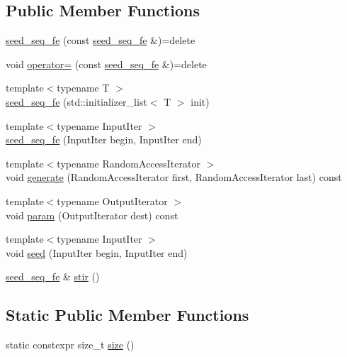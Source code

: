 \subsection*{Public Member Functions}
\begin{DoxyCompactItemize}
\item 
\hyperlink{structrandutils_1_1seed__seq__fe_adfc89fa1466e011b999baad509645b50}{seed\+\_\+seq\+\_\+fe} (const \hyperlink{structrandutils_1_1seed__seq__fe}{seed\+\_\+seq\+\_\+fe} \&)=delete
\item 
void \hyperlink{structrandutils_1_1seed__seq__fe_a117fb76a53d51b628c7ef267b47f0753}{operator=} (const \hyperlink{structrandutils_1_1seed__seq__fe}{seed\+\_\+seq\+\_\+fe} \&)=delete
\item 
{\footnotesize template$<$typename T $>$ }\\\hyperlink{structrandutils_1_1seed__seq__fe_ad716e450723c10c84a725a2e7bd0fbcd}{seed\+\_\+seq\+\_\+fe} (std\+::initializer\+\_\+list$<$ T $>$ init)
\item 
{\footnotesize template$<$typename Input\+Iter $>$ }\\\hyperlink{structrandutils_1_1seed__seq__fe_a18d0ce2ce0ac242c65e7d0aade46816e}{seed\+\_\+seq\+\_\+fe} (Input\+Iter begin, Input\+Iter end)
\item 
{\footnotesize template$<$typename Random\+Access\+Iterator $>$ }\\void \hyperlink{structrandutils_1_1seed__seq__fe_ae7622793bcbdafbeeb533413b1e3e340}{generate} (Random\+Access\+Iterator first, Random\+Access\+Iterator last) const 
\item 
{\footnotesize template$<$typename Output\+Iterator $>$ }\\void \hyperlink{structrandutils_1_1seed__seq__fe_a8b35797e2f894d92bd02cc5eb45f6915}{param} (Output\+Iterator dest) const 
\item 
{\footnotesize template$<$typename Input\+Iter $>$ }\\void \hyperlink{structrandutils_1_1seed__seq__fe_ad4b55fdb44ca51461e4e9aa9ec6aba89}{seed} (Input\+Iter begin, Input\+Iter end)
\item 
\hyperlink{structrandutils_1_1seed__seq__fe}{seed\+\_\+seq\+\_\+fe} \& \hyperlink{structrandutils_1_1seed__seq__fe_af0bd79352a6fee86f10fb4d45058ef79}{stir} ()
\end{DoxyCompactItemize}
\subsection*{Static Public Member Functions}
\begin{DoxyCompactItemize}
\item 
static constexpr size\+\_\+t \hyperlink{structrandutils_1_1seed__seq__fe_a3e9976ba5975a1ca19974cf4eaba72bc}{size} ()
\end{DoxyCompactItemize}


